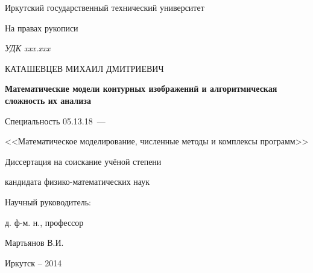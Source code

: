 \thispagestyle{empty}

\begin{center}
Иркутский государственный технический университет\par
\par
\end{center}

\vspace{20mm}
\begin{flushright}
На правах рукописи

{\sl УДК xxx.xxx}
\end{flushright}

\vspace{30mm}
\begin{center}
{\large КАТАШЕВЦЕВ МИХАИЛ ДМИТРИЕВИЧ}
\end{center}

\vspace{5mm}
\begin{center}
{\bf \large Математические модели контурных изображений и алгоритмическая сложность их анализа
\par}

\vspace{10mm}
{%
Специальность 05.13.18~---

<<Математическое моделирование, численные методы и комплексы программ>>
}

\vspace{10mm}
Диссертация на соискание учёной степени

кандидата физико-математических наук
\end{center}

\vspace{20mm}
\begin{flushright}
Научный руководитель:

д. ф-м. н., профессор

Мартьянов В.И.

\end{flushright}

\vspace{20mm}
\begin{center}
{Иркутск -- 2014}
\end{center}

\newpage